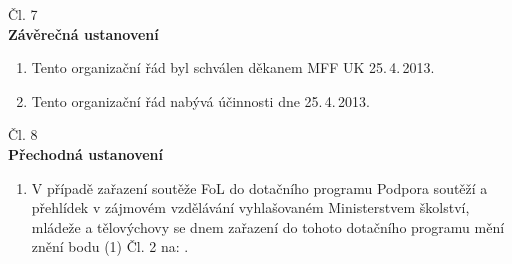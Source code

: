 \documentclass[a4paper,11pt,oneside]{article}
\begin{document}
\begin{center}
{\Large{Čl. 7}}\\
\large{\bf{Závěrečná ustanovení}}
\end{center}

\begin{enumerate}[(1)]
\item Tento organizační řád byl schválen děkanem MFF UK 25.\,4.\,2013.

\item Tento organizační řád nabývá účinnosti dne 25.\,4.\,2013.
\end{enumerate}

\begin{center}
{\Large{Čl. 8}}\\
\large{\bf{Přechodná ustanovení}}
\end{center}

\begin{enumerate}[(1)]
\item V případě zařazení soutěže FoL do dotačního programu Podpora soutěží a přehlídek v zájmovém vzdělávání vyhlašovaném Ministerstvem školství, mládeže a tělovýchovy se dnem zařazení do tohoto dotačního programu mění znění bodu (1) Čl. 2 na: .
\end{enumerate}
\end{document}
